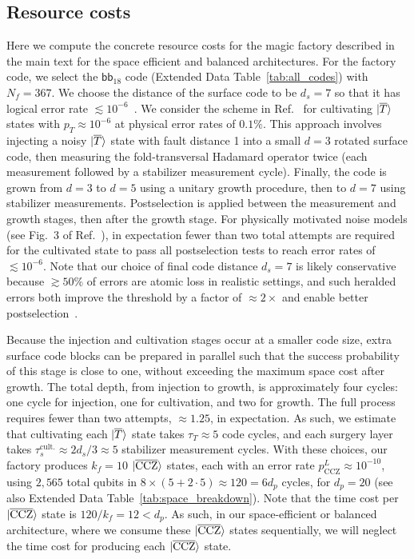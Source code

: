 \documentclass[reprint,twocolumn,secnumarabic,amssymb, aps, prx]{revtex4-2}
\newcommand{\bb}{\mbox{$\mathsf{bb}_{18}$}}
\newcommand{\dproc}{d_p}
\newcommand{\Nf}{N_f}
\newcommand{\kf}{k_f}
\newcommand{\ds}{d_s}
\newcommand{\tauscult}{\tau_s^{\text{cult.}}}
\newcommand{\lket}[1]{\ket{\overline{#1}}}
\newcommand{\ccz}{\ket{\overline{\text{CCZ}}}}
\begin{document}
\subsection{Resource costs \label{app:magic_resource}}
Here we compute the concrete resource costs for the magic factory described in the main text for the space efficient and balanced architectures. For the factory code, we select the $\bb$ code (Extended Data Table~\ref{tab:all_codes}) with $\Nf= 367$. We choose the distance of the surface code to be $\ds = 7$ so that it has logical error rate $\lesssim 10^{-6}$~\cite{ismail2025transversal}. We consider the scheme in Ref.~\cite{sahay2025fold} for cultivating $\lket{T}$ states with $p_T \approx 10^{-6}$ at physical error rates of $0.1\%$. This approach involves injecting a noisy $\lket{T}$ state with fault distance 1 into a small \mbox{$d=3$} rotated surface code, then measuring the fold-transversal Hadamard operator twice (each measurement followed by a stabilizer measurement cycle). Finally, the code is grown from \mbox{$d=3$} to \mbox{$d=5$} using a unitary growth procedure, then to \mbox{$d=7$} using stabilizer measurements. Postselection is applied between the measurement and growth stages, then after the growth stage. For physically motivated noise models (see Fig.~3 of Ref.~\cite{sahay2025fold}), in expectation fewer than two total attempts are required for the cultivated state to pass all postselection tests to reach error rates of $\lesssim10^{-6}$. Note that our choice of final code distance \mbox{$\ds= 7$} is likely conservative because $\gtrsim50\%$ of errors are atomic loss in realistic settings, and such heralded errors both improve the threshold by a factor of \mbox{$\approx 2\times$} and enable better postselection~\cite{vaknin2025efficient}.

Because the injection and cultivation stages occur at a smaller code size, extra surface code blocks can be prepared in parallel such that the success probability of this stage is close to one, without exceeding the maximum space cost after growth. The total depth, from injection to growth, is approximately four cycles: one cycle for injection, one for cultivation, and two for growth. The full process requires fewer than two attempts, $\approx1.25$, in expectation. As such, we estimate that cultivating each $\lket{T}$ state takes $\tau_T \approx 5$ code cycles, and each surgery layer takes $\tauscult \approx 2\ds/3 \approx 5$ stabilizer measurement cycles. With these choices, our factory produces \mbox{$\kf = 10$} $\ccz$ states, each with an error rate $p^L_{\mathrm{CCZ}} \approx 10^{-10}$, using $2{,}565$ total qubits in $8\times(5+2\cdot 5)\approx 120 = 6\dproc$ cycles, for $\dproc = 20$ (see also Extended Data Table~\ref{tab:space_breakdown}). Note that the time cost per $\ccz$ state is $120/\kf = 12 < \dproc$. As such, in our space-efficient or balanced architecture, where we consume these $\ccz$ states sequentially, we will neglect the time cost for producing each $\ccz$ state. 
\end{document}

